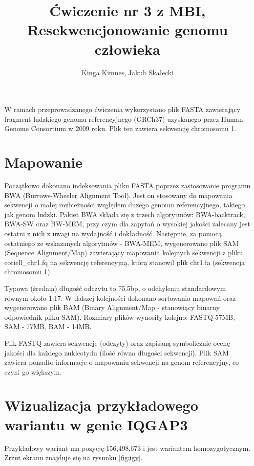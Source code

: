 \documentclass[a4paper]{article}
\begin{document}
\title{Ćwiczenie nr 3 z MBI, Resekwencjonowanie genomu człowieka}
\author{Kinga Kimnes, Jakub Skałecki}
\maketitle

W ramach przeprowadzanego ćwiczenia wykorzystano plik FASTA zawierający fragment ludzkiego genomu referencyjnego (GRCh37) uzyskanego przez Human Genome Consortium w 2009 roku. Plik ten zawiera sekwencję chromosomu 1.

\section{Mapowanie}


Początkowo dokonano indeksowania pliku FASTA poprzez zastosowanie programu BWA (Burrows-Wheeler Alignment Tool).
Jest on stosowany do mapowania sekwencji o małej rozbieżności względem duzego genomu referencyjnego, takiego jak genom ludzki.
Pakiet BWA składa się z trzech algorytmów: BWA-backtrack, BWA-SW oraz BW-MEM, przy czym dla zapytań o wysokiej jakości zalecany jest ostatni z nich z uwagi na wydajność i dokładność.
Następnie, za pomocą ostatniego ze wskazanych algorytmów - BWA-MEM, wygenerowano plik SAM (Sequence Alignment/Map) zawierający mapowania kolejnych sekwencji z pliku coriell\_chr1.fq na sekwencję referencyjną, którą stanowił plik chr1.fa (sekwencja chromosomu 1).

Typowa (średnia) długość odczytu to 75.5bp, o odchyleniu standardowym równym około 1.17.
W dalszej kolejności dokonano sortowania mapowań oraz wygenerowano plik BAM (Binary Alignment/Map - stanowiący binarny odpowiednik pliku SAM). Rozmiary plików wynosiły kolejno: FASTQ-57MB, SAM - 77MB, BAM - 14MB.

Plik FASTQ zawiera sekwencje (odczyty) oraz zapisaną symbolicznie ocenę jakości dla każdego nukleotydu (ilość równa długości sekwencji). Plik SAM zawiera ponadto informacje o mapowaniu sekwencji na genom referencyjny, co czyni go większym.

\section{Wizualizacja przykładowego wariantu w genie IQGAP3}

Przykładowy wariant ma pozycję 156,498,673 i jest wariantem homozygotycznym. Zrzut ekranu znajduje się na rysunku \ref{fig:igv}.
\end{document}
